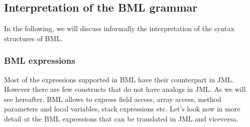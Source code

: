 \subsection{Interpretation of the BML grammar}

In the following, we will discuss informally the interpretation of the syntax structures of BML.

\subsubsection{BML expressions}
Most of the expressions supported in BML have their counterpart in JML. However there are few constructs that do
not have analogs in JML. As we will see hereafter, BML allows
to express field access, array access, method parameters and local variables, stack expressions etc.     
Let's look now in more detail at the BML expressions that can be translated in JML and viceversa. 

